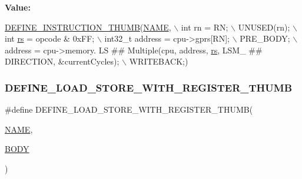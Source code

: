 {\bfseries Value\+:}
\begin{DoxyCode}
\mbox{\hyperlink{isa-thumb_8c_aca0a4c9b536fe9f14f89105945cfeb3d}{DEFINE\_INSTRUCTION\_THUMB}}(\mbox{\hyperlink{inflate_8h_a164ea0159d5f0b5f12a646f25f99eceaa67bc2ced260a8e43805d2480a785d312}{NAME}}, \(\backslash\)
        \textcolor{keywordtype}{int} rn = RN; \(\backslash\)
        UNUSED(rn); \(\backslash\)
        int \mbox{\hyperlink{isa-thumb_8c_a03b78d51ad860bbea2f9c98276d0b70b}{rs}} = opcode & 0xFF; \(\backslash\)
        int32\_t address = cpu->gprs[RN]; \(\backslash\)
        PRE\_BODY; \(\backslash\)
        address = cpu->memory. LS ## Multiple(cpu, address, \mbox{\hyperlink{isa-thumb_8c_a03b78d51ad860bbea2f9c98276d0b70b}{rs}}, LSM\_ ## DIRECTION, &currentCycles); \(\backslash\)
        WRITEBACK;)
\end{DoxyCode}
\mbox{\label{isa-thumb_8c_a6032a23085784e5aafd1aa033ff8b0d8}} 
\subsubsection{\texorpdfstring{D\+E\+F\+I\+N\+E\+\_\+\+L\+O\+A\+D\+\_\+\+S\+T\+O\+R\+E\+\_\+\+W\+I\+T\+H\+\_\+\+R\+E\+G\+I\+S\+T\+E\+R\+\_\+\+T\+H\+U\+MB}{DEFINE\_LOAD\_STORE\_WITH\_REGISTER\_THUMB}}
{\footnotesize\ttfamily \#define D\+E\+F\+I\+N\+E\+\_\+\+L\+O\+A\+D\+\_\+\+S\+T\+O\+R\+E\+\_\+\+W\+I\+T\+H\+\_\+\+R\+E\+G\+I\+S\+T\+E\+R\+\_\+\+T\+H\+U\+MB(\begin{DoxyParamCaption}\item[{}]{\mbox{\hyperlink{inflate_8h_a164ea0159d5f0b5f12a646f25f99eceaa67bc2ced260a8e43805d2480a785d312}{N\+A\+ME}},  }\item[{}]{\mbox{\hyperlink{gzlog_8c_aa6bdf6a6d9916c343e1e17774d84a156}{B\+O\+DY}} }\end{DoxyParamCaption})}

